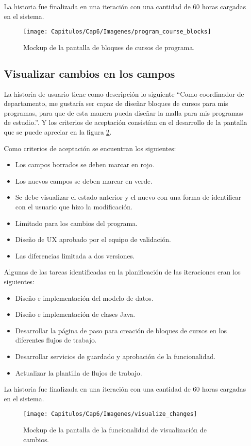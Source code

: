 La historia fue finalizada en una iteración con una cantidad de 60 horas cargadas en el sistema.

\begin{figure}[H]
\centering
\texttt{[image: Capitulos/Cap6/Imagenes/program\_course\_blocks]}
\caption{Mockup de la pantalla de bloques de cursos de programa.}
  \label{program_course_blocks}
\end{figure}

\subsection{Visualizar cambios en los campos}
La historia de usuario tiene como descripción lo siguiente \enquote{Como coordinador de departamento, me gustaría ser capaz de diseñar bloques de cursos para mis programas, para que de esta manera pueda diseñar la malla para mis programas de estudio.}. Y los criterios de aceptación consistían en el desarrollo de la pantalla que se puede apreciar en la figura \ref{visualize_changes}.

Como criterios de aceptación se encuentran los siguientes:
\begin{itemize}
	\item Los campos borrados se deben marcar en rojo.
	\item Los nuevos campos se deben marcar en verde.
	\item Se debe visualizar el estado anterior y el nuevo con una forma de identificar con el usuario que hizo la modificación.
	\item Limitado para los cambios del programa.
	\item Diseño de UX aprobado por el equipo de validación.
	\item Las diferencias limitada a dos versiones.
\end{itemize}

Algunas de las tareas identificadas en la planificación de las iteraciones eran los siguientes:
\begin{itemize}
	\item Diseño e implementación del modelo de datos.
	\item Diseño e implementación de clases Java.
	\item Desarrollar la página de paso para creación de bloques de cursos en los diferentes flujos de trabajo.
	\item Desarrollar servicios de guardado y aprobación de la funcionalidad.
	\item Actualizar la plantilla de flujos de trabajo.
\end{itemize}

La historia fue finalizada en una iteración con una cantidad de 60 horas cargadas en el sistema.

\begin{figure}[H]
\centering
\texttt{[image: Capitulos/Cap6/Imagenes/visualize\_changes]}
\caption{Mockup de la pantalla de la funcionalidad de visualización de cambios.}
  \label{visualize_changes}
\end{figure}
